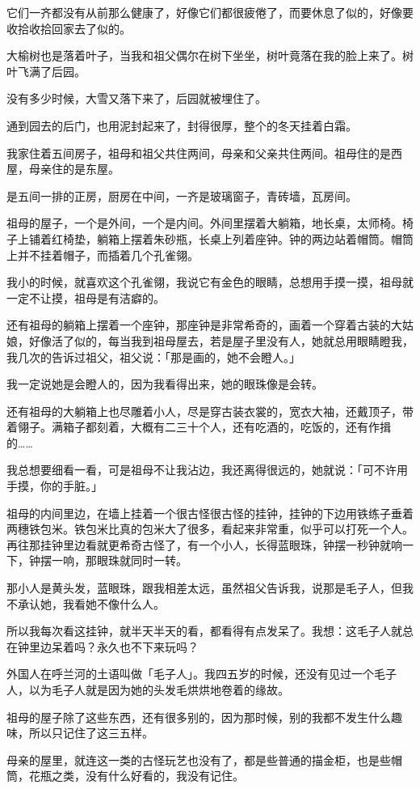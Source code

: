 \documentclass[UTF8]{ctexart}
\begin{document}
它们一齐都没有从前那么健康了，好像它们都很疲倦了，而要休息了似的，好像要收拾收拾回家去了似的。

大榆树也是落着叶子，当我和祖父偶尔在树下坐坐，树叶竟落在我的脸上来了。树叶飞满了后园。

没有多少时候，大雪又落下来了，后园就被埋住了。

通到园去的后门，也用泥封起来了，封得很厚，整个的冬天挂着白霜。

我家住着五间房子，祖母和祖父共住两间，母亲和父亲共住两间。祖母住的是西屋，母亲住的是东屋。

是五间一排的正房，厨房在中间，一齐是玻璃窗子，青砖墙，瓦房间。

祖母的屋子，一个是外间，一个是内间。外间里摆着大躺箱，地长桌，太师椅。椅子上铺着红椅垫，躺箱上摆着朱砂瓶，长桌上列着座钟。钟的两边站着帽筒。帽筒上并不挂着帽子，而插着几个孔雀翎。

我小的时候，就喜欢这个孔雀翎，我说它有金色的眼睛，总想用手摸一摸，祖母就一定不让摸，祖母是有洁癖的。

还有祖母的躺箱上摆着一个座钟，那座钟是非常希奇的，画着一个穿着古装的大姑娘，好像活了似的，每当我到祖母屋去，若是屋子里没有人，她就总用眼睛瞪我，我几次的告诉过祖父，祖父说：「那是画的，她不会瞪人。」

我一定说她是会瞪人的，因为我看得出来，她的眼珠像是会转。

还有祖母的大躺箱上也尽雕着小人，尽是穿古装衣裳的，宽衣大袖，还戴顶子，带着翎子。满箱子都刻着，大概有二三十个人，还有吃酒的，吃饭的，还有作揖的……

我总想要细看一看，可是祖母不让我沾边，我还离得很远的，她就说：「可不许用手摸，你的手脏。」

祖母的内间里边，在墙上挂着一个很古怪很古怪的挂钟，挂钟的下边用铁练子垂着两穗铁包米。铁包米比真的包米大了很多，看起来非常重，似乎可以打死一个人。再往那挂钟里边看就更希奇古怪了，有一个小人，长得蓝眼珠，钟摆一秒钟就响一下，钟摆一响，那眼珠就同时一转。

那小人是黄头发，蓝眼珠，跟我相差太远，虽然祖父告诉我，说那是毛子人，但我不承认她，我看她不像什么人。

所以我每次看这挂钟，就半天半天的看，都看得有点发呆了。我想：这毛子人就总在钟里边呆着吗？永久也不下来玩吗？

外国人在呼兰河的土语叫做「毛子人」。我四五岁的时候，还没有见过一个毛子人，以为毛子人就是因为她的头发毛烘烘地卷着的缘故。

祖母的屋子除了这些东西，还有很多别的，因为那时候，别的我都不发生什么趣味，所以只记住了这三五样。

母亲的屋里，就连这一类的古怪玩艺也没有了，都是些普通的描金柜，也是些帽筒，花瓶之类，没有什么好看的，我没有记住。
\end{document}
